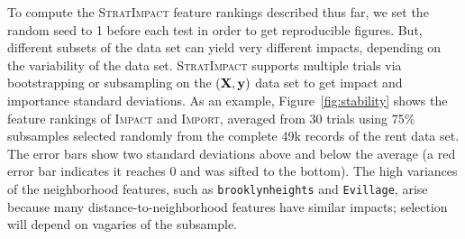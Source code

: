 \documentclass[11pt]{article}
\newcommand{\figref}[1]{Figure~\ref{#1}}
\newcommand{\Imp}{\fontfamily{cmr}\textsc{Impact}}
\newcommand{\Impo}{\fontfamily{cmr}\textsc{Import}}
\newcommand{\simp}{\fontfamily{cmr}\textsc{\small StratImpact}}
\begin{document}
To compute the \simp{} feature rankings described thus far, we set the random seed to 1 before each test in order to get reproducible figures.  But, different subsets of the data set can yield very different impacts, depending on the variability of the data set. \simp{} supports multiple trials via bootstrapping or subsampling on the $(\bf X, y)$ data set to get impact and importance standard deviations.  As an example, \figref{fig:stability} shows the  feature rankings of \Imp{} and \Impo{}, averaged from 30 trials using 75\% subsamples selected randomly from the complete 49k records of the rent data set. The error bars show two standard deviations above and below the average (a red error bar indicates it reaches 0 and was sifted to the bottom).  The high variances of the neighborhood features, such as {\tt brooklynheights} and {\tt Evillage}, arise because many distance-to-neighborhood features have similar impacts; selection will depend on vagaries of the subsample.
 
\end{document}
